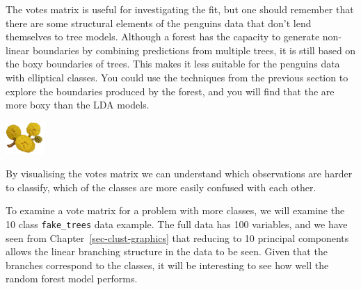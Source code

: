 \documentclass[
  letterpaper,
]{krantz}
\newenvironment{Shaded}{\begin{snugshade}}{\end{snugshade}}
\newcommand{\AttributeTok}[1]{\textcolor[rgb]{0.40,0.45,0.13}{#1}}
\newcommand{\ConstantTok}[1]{\textcolor[rgb]{0.56,0.35,0.01}{#1}}
\newcommand{\DecValTok}[1]{\textcolor[rgb]{0.68,0.00,0.00}{#1}}
\newcommand{\FunctionTok}[1]{\textcolor[rgb]{0.28,0.35,0.67}{#1}}
\newcommand{\NormalTok}[1]{\textcolor[rgb]{0.00,0.23,0.31}{#1}}
\newcommand{\OtherTok}[1]{\textcolor[rgb]{0.00,0.23,0.31}{#1}}
\newcommand{\SpecialCharTok}[1]{\textcolor[rgb]{0.37,0.37,0.37}{#1}}
\newcommand{\infobox}[1]{%
\noindent\colorbox{info!30}{%
\begin{minipage}{0.98\linewidth}%
    \centering%
    \begin{minipage}[c]{0.15\linewidth} %
      \includegraphics[width=1.5cm]{images/mulga-flowers2.png} %
    \end{minipage}%
    \hfill %
    \begin{minipage}[c]{0.8\linewidth} %
      \bigskip%
      \textsf{#1}%
      \bigskip%
    \end{minipage}%
    \hspace*{3mm}%
  \end{minipage}%
}%
}
\begin{document}
The votes matrix is useful for investigating the fit, but one should
remember that there are some structural elements of the penguins data
that don't lend themselves to tree models. Although a forest has the
capacity to generate non-linear boundaries by combining predictions from
multiple trees, it is still based on the boxy boundaries of trees. This
makes it less suitable for the penguins data with elliptical classes.
You could use the techniques from the previous section to explore the
boundaries produced by the forest, and you will find that the are more
boxy than the LDA models. 

\infobox{By visualising the votes matrix we can understand which observations are harder to classify, which of the classes are more easily confused with each other.}

To examine a vote matrix for a problem with more classes, we will
examine the 10 class \texttt{fake\_trees} data example. The full data
has 100 variables, and we have seen from
Chapter~\ref{sec-clust-graphics} that reducing to 10 principal
components allows the linear branching structure in the data to be seen.
Given that the branches correspond to the classes, it will be
interesting to see how well the random forest model performs.

\begin{Shaded}
\end{Shaded}
\end{document}
